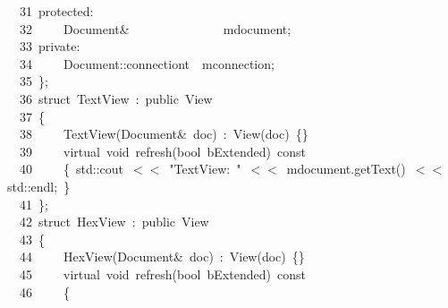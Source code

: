 \documentclass[9pt,onside,a4paper]{article}
\newcommand{\hlstd}[1]{\textcolor[rgb]{0.2,0,0.4}{#1}}
\newcommand{\hlstr}[1]{\textcolor[rgb]{0.09,0.38,0.65}{#1}}
\newcommand{\hlopt}[1]{\textcolor[rgb]{0.33,0.33,0.33}{#1}}
\newcommand{\hllin}[1]{\textcolor[rgb]{0.6,0.6,0.6}{#1}}
\newcommand{\hlkwb}[1]{\textcolor[rgb]{0.96,0.55,0.14}{#1}}
\newcommand{\hlkwc}[1]{\textcolor[rgb]{0,0,1}{#1}}
\newcommand{\hlkwd}[1]{\textcolor[rgb]{0.82,0.11,0.93}{#1}}
\begin{document}
\hllin{\ \ \ 31\ }\hlstd{}\hlkwc{protected}\hlstd{}\hlopt{:}\\
\hllin{\ \ \ 32\ }\hlstd{}\hlstd{\ \ \ \ }\hlstd{Document}\hlopt{\&}\hlstd{\ \ \ \ \ \ \ \ \ \ \ \ \ \ \ }\hlopt{}\hlstd{m\textunderscore document}\hlopt{;}\\
\hllin{\ \ \ 33\ }\hlstd{}\hlkwc{private}\hlstd{}\hlopt{:}\\
\hllin{\ \ \ 34\ }\hlstd{}\hlstd{\ \ \ \ }\hlstd{Document}\hlopt{::}\hlstd{connection\textunderscore t}\hlstd{\ \ }\hlstd{m\textunderscore connection}\hlopt{;}\\
\hllin{\ \ \ 35\ }\hlstd{}\hlopt{\};}\\
\hllin{\ \ \ 36\ }\hlstd{}\hlkwb{struct\ }\hlstd{TextView\ }\hlopt{:\ }\hlstd{}\hlkwc{public\ }\hlstd{View}\\
\hllin{\ \ \ 37\ }\hlopt{\{}\\
\hllin{\ \ \ 38\ }\hlstd{}\hlstd{\ \ \ \ }\hlstd{}\hlkwd{TextView}\hlstd{}\hlopt{(}\hlstd{Document}\hlopt{\&\ }\hlstd{doc}\hlopt{)\ :\ }\hlstd{}\hlkwd{View}\hlstd{}\hlopt{(}\hlstd{doc}\hlopt{)\ \{\}}\\
\hllin{\ \ \ 39\ }\hlstd{}\hlstd{\ \ \ \ }\hlstd{}\hlkwc{virtual\ }\hlstd{}\hlkwb{void\ }\hlstd{}\hlkwd{refresh}\hlstd{}\hlopt{(}\hlstd{}\hlkwb{bool\ }\hlstd{bExtended}\hlopt{)\ }\hlstd{}\hlkwb{const}\\
\hllin{\ \ \ 40\ }\hlstd{}\hlstd{\ \ \ \ }\hlstd{}\hlopt{\{\ }\hlstd{std}\hlopt{::}\hlstd{cout\ }\hlopt{$<$$<$\ }\hlstd{}\hlstr{"TextView:\ "}\hlstd{\ }\hlopt{$<$$<$\ }\hlstd{m\textunderscore document}\hlopt{.}\hlstd{}\hlkwd{getText}\hlstd{}\hlopt{()\ $<$$<$\ }\hlstd{std}\hlopt{::}\hlstd{endl}\hlopt{;\ \}}\\
\hllin{\ \ \ 41\ }\hlstd{}\hlopt{\};}\\
\hllin{\ \ \ 42\ }\hlstd{}\hlkwb{struct\ }\hlstd{HexView\ }\hlopt{:\ }\hlstd{}\hlkwc{public\ }\hlstd{View}\\
\hllin{\ \ \ 43\ }\hlopt{\{}\\
\hllin{\ \ \ 44\ }\hlstd{}\hlstd{\ \ \ \ }\hlstd{}\hlkwd{HexView}\hlstd{}\hlopt{(}\hlstd{Document}\hlopt{\&\ }\hlstd{doc}\hlopt{)\ :\ }\hlstd{}\hlkwd{View}\hlstd{}\hlopt{(}\hlstd{doc}\hlopt{)\ \{\}}\\
\hllin{\ \ \ 45\ }\hlstd{}\hlstd{\ \ \ \ }\hlstd{}\hlkwc{virtual\ }\hlstd{}\hlkwb{void\ }\hlstd{}\hlkwd{refresh}\hlstd{}\hlopt{(}\hlstd{}\hlkwb{bool\ }\hlstd{bExtended}\hlopt{)\ }\hlstd{}\hlkwb{const}\\
\hllin{\ \ \ 46\ }\hlstd{}\hlstd{\ \ \ \ }\hlstd{}\hlopt{\{}\\
\end{document}
